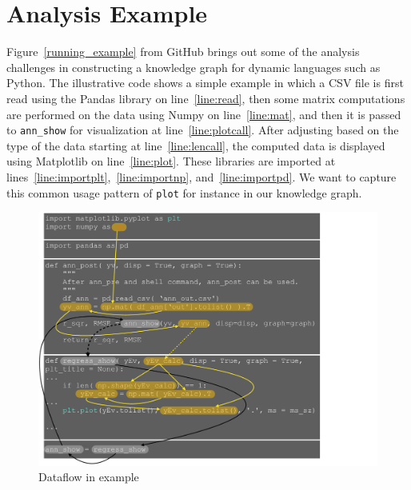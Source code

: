 \section{Analysis Example}
\label{sec:example}

Figure~\ref{running_example} from GitHub brings out some of the analysis  
challenges in constructing a knowledge graph for dynamic languages such as Python.  
The illustrative code shows a simple example in which a CSV file is  
first read using the Pandas library on line~\ref{line:read}, then some  
matrix computations are performed on the data using Numpy on  
line~\ref{line:mat}, and then it is passed to {\tt ann\_show} for  
visualization at line~\ref{line:plotcall}.  After adjusting based on  
the type of the data starting at line~\ref{line:lencall}, the computed data is  
displayed using Matplotlib on line~\ref{line:plot}.  These libraries  
are imported at lines~\ref{line:importplt},~\ref{line:importnp}, and~\ref{line:importpd}.  We want to  
capture this common usage pattern of {\tt plot} for instance in our knowledge  
graph. 

\begin{figure}[htb]
\begin{center}
\includegraphics[width=5in]{paper_figures/example_flow}
\end{center}
\caption{Dataflow in example}
\label{fig:code_graph}
\end{figure}

